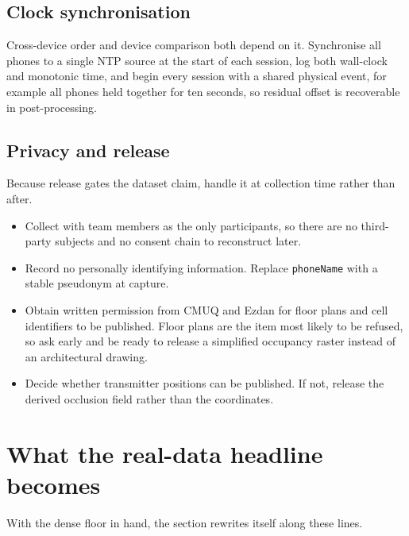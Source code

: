 \documentclass[11pt,a4paper]{article}
\begin{document}
\subsection{Clock synchronisation}

Cross-device order and device comparison both depend on it. Synchronise all phones to a
single NTP source at the start of each session, log both wall-clock and monotonic time,
and begin every session with a shared physical event, for example all phones held
together for ten seconds, so residual offset is recoverable in post-processing.

\subsection{Privacy and release}

Because release gates the dataset claim, handle it at collection time rather than after.
\begin{itemize}
\item Collect with team members as the only participants, so there are no third-party
subjects and no consent chain to reconstruct later.
\item Record no personally identifying information. Replace \texttt{phoneName} with a
stable pseudonym at capture.
\item Obtain written permission from CMUQ and Ezdan for floor plans and cell identifiers
to be published. Floor plans are the item most likely to be refused, so ask early and be
ready to release a simplified occupancy raster instead of an architectural drawing.
\item Decide whether transmitter positions can be published. If not, release the derived
occlusion field rather than the coordinates.
\end{itemize}

\section{What the real-data headline becomes}

With the dense floor in hand, the section rewrites itself along these lines.
\end{document}
